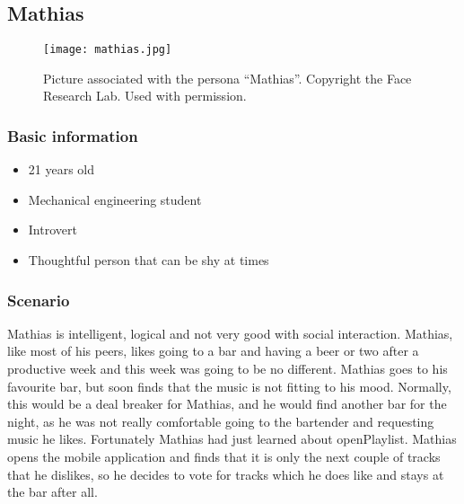 \subsection{Mathias}
\begin{figure}[hbtp]
  \centering
  \texttt{[image: mathias.jpg]}
  \caption[Persona \enquote{Mathias}.]{Picture associated with the persona \enquote{Mathias}. Copyright the Face Research Lab. Used with permission.}\label{fig:mathias}
\end{figure}

\subsubsection{Basic information}
\begin{itemize}
\item 21 years old
\item Mechanical engineering student
\item Introvert
\item Thoughtful person that can be shy at times
\end{itemize}

\subsubsection{Scenario}
Mathias is intelligent, logical and not very good with social interaction. Mathias, like most of his peers, likes going to a bar and having a beer or two after a productive week and this week was going to be no different. Mathias goes to his favourite bar, but soon finds that the music is not fitting to his mood. Normally, this would be a deal breaker for Mathias, and he would find another bar for the night, as he was not really comfortable going to the bartender and requesting music he likes. Fortunately Mathias had just learned about openPlaylist. Mathias opens the mobile application and finds that it is only the next couple of tracks that he dislikes, so he decides to vote for tracks which he does like and stays at the bar after all.
